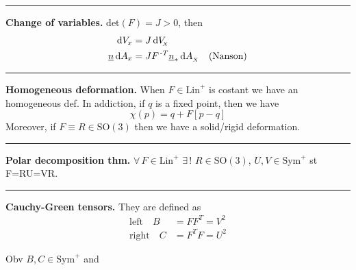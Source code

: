 \rule{0.31\textwidth}{0.2pt}
\smallskip

\textbf{Change of variables.} $\text{det}(F)=J>0$, then
\begin{align*}
\mathrm{d} V_x &= J\,\mathrm{d} V_{\!_X} \\
\underline{n}\,\mathrm{d} A_x &= JF^{\,\text{-}T}\underline{n}_*\,\mathrm{d} A_{_X}\quad(\text{Nanson})
\end{align*}

\rule{0.31\textwidth}{0.2pt}
\smallskip

\textbf{Homogeneous deformation.} When $F\in\text{Lin}^+$ is costant we have an homogeneous def. In addiction, if $q$ is a fixed point, then we have
\begin{equation*}
\chi(p)=q+F[p-q]
\end{equation*}
Moreover, if $F\equiv R\in \text{SO}(3)$ then we have a solid/rigid deformation.

\rule{0.31\textwidth}{0.2pt}
\smallskip

\textbf{Polar decomposition thm.} $\forall\,F\in\text{Lin}^+$ $\exists\,!$ $R\in\text{SO}(3)$, $U,V\in\text{Sym}^+$ st F=RU=VR.

\begin{Figure}
\end{Figure}

\rule{0.31\textwidth}{0.2pt}
\smallskip

\textbf{Cauchy-Green tensors.} They are defined as
\begin{align*}
\text{left}\quad B&=FF^T=V^2 \\
\text{right}\quad C&=F^TF=U^2
\end{align*}

Obv $B,C\in\text{Sym}^+$ and 
\begin{Figure}
\end{Figure}

